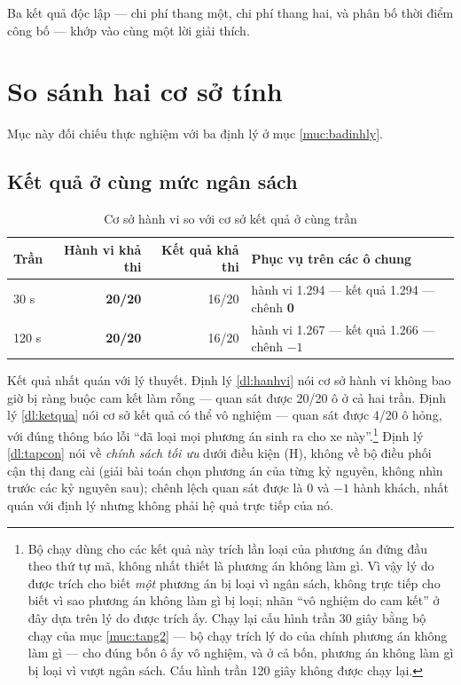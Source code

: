 Ba kết quả độc lập --- chi phí thang một, chi phí thang hai, và phân bố thời điểm công bố ---
khớp vào cùng một lời giải thích.

\section{So sánh hai cơ sở tính}
\label{muc:haicoso}

Mục này đối chiếu thực nghiệm với ba định lý ở mục \ref{muc:badinhly}.

\subsection{Kết quả ở cùng mức ngân sách}

\begin{table}[htbp]
\centering
\caption{Cơ sở hành vi so với cơ sở kết quả ở cùng trần}
\label{bang:coso}
\small
\begin{tabular}{@{}lrrl@{}}
\toprule
\textbf{Trần} & \textbf{Hành vi khả thi} & \textbf{Kết quả khả thi} & \textbf{Phục vụ trên các ô chung}\\
\midrule
30 s & \textbf{20/20} & 16/20 & hành vi 1.294 --- kết quả 1.294 --- chênh \textbf{0}\\
120 s & \textbf{20/20} & 16/20 & hành vi 1.267 --- kết quả 1.266 --- chênh $-1$\\
\bottomrule
\end{tabular}
\end{table}

Kết quả nhất quán với lý thuyết. Định lý \ref{dl:hanhvi} nói cơ sở hành vi không bao giờ bị
ràng buộc cam kết làm rỗng --- quan sát được 20/20 ô ở cả hai trần. Định lý \ref{dl:ketqua} nói
cơ sở kết quả có thể vô nghiệm --- quan sát được 4/20 ô hỏng, với đúng thông báo lỗi ``đã loại
mọi phương án sinh ra cho xe này''.\footnote{Bộ chạy dùng cho các kết quả này trích lần loại của
phương án đứng đầu theo thứ tự mã, không nhất thiết là phương án không làm gì. Vì vậy lý do được trích
cho biết \emph{một} phương án bị loại vì ngân sách, không trực tiếp cho biết vì sao phương án không
làm gì bị loại; nhãn ``vô nghiệm do cam kết'' ở đây dựa trên lý do được trích ấy. Chạy lại cấu hình
trần 30 giây bằng bộ chạy của mục \ref{muc:tang2} --- bộ chạy trích lý do của chính phương án không
làm gì --- cho đúng bốn ô ấy vô nghiệm, và ở cả bốn, phương án không làm gì bị loại vì vượt ngân sách.
Cấu hình trần 120 giây không được chạy lại.} Định lý \ref{dl:tapcon} nói về \emph{chính sách tối ưu} dưới
điều kiện (H), không về bộ điều phối cận thị đang cài (giải bài toán chọn phương án của từng kỷ
nguyên, không nhìn trước các kỷ nguyên sau); chênh lệch quan sát được là 0 và $-1$ hành
khách, nhất quán với định lý nhưng không phải hệ quả trực tiếp của nó.

